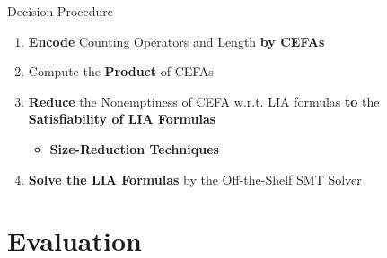 \documentclass[landscape]{beamer}
\newcommand{\myvec}[1]{\overrightarrow{#1}}
\begin{document}






\begin{frame}{Decision Procedure}
  \begin{enumerate}
    \item \textbf{Encode} Counting Operators and Length \textbf{by CEFAs}
    \item Compute the \textbf{Product} of CEFAs
    \item \textbf{Reduce} the Nonemptiness of CEFA w.r.t. LIA formulas \textbf{to} the \textbf{Satisfiability of LIA Formulas}
          \begin{itemize}
            \item \textbf{Size-Reduction Techniques}
          \end{itemize}
    \item \textbf{Solve the LIA Formulas} by the Off-the-Shelf SMT Solver
  \end{enumerate}
\end{frame}


\section{Evaluation}
\end{document}
